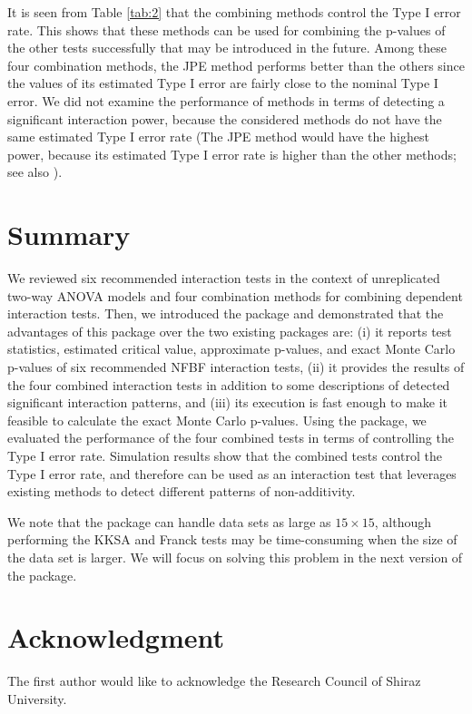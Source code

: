It is seen from Table \ref{tab:2} that the {combining} methods control the {Type I error} rate. This shows that these methods can be used for combining the p-values of the other tests successfully that {may be introduced} in the future. Among these four combination methods, the JPE method performs better than the others since the values of its estimated {Type I error} are fairly close to the nominal {Type I error}. We did not examine the performance of methods in terms of detecting a significant interaction power, because the considered methods do not have the same estimated Type I error rate (The JPE method would have the highest power, because its estimated Type I error rate is higher than the other methods; see also ).

\section{Summary}
We {reviewed six} recommended interaction tests in the context of unreplicated two-way ANOVA models and four combination methods for combining dependent interaction tests. Then, we introduced the  package {and demonstrated that the} advantages of this package over the two existing packages are: (i) it reports test statistics, estimated critical value, approximate p-values, and exact Monte Carlo p-values {of six} recommended NFBF interaction tests, (ii) it provides the results of the four combined interaction tests in addition to some descriptions of detected significant interaction patterns, and (iii) its execution is fast enough to make it feasible to calculate the exact Monte Carlo p-values. Using the  package, we evaluated the performance of the four combined tests in terms of controlling the {Type I error} rate. Simulation results show that the combined tests control the {Type I error} rate, and therefore can be used as an interaction test that leverages existing methods to detect different patterns of non-additivity.

We note that the  package can handle data sets as large as $15\times15$, {although} performing the KKSA and Franck tests may be time-consuming when the size of the data set is larger. We will focus on solving this problem in {the next version of the package}. 

\section{Acknowledgment}
The first author would like to {acknowledge} the Research Council of Shiraz University.

